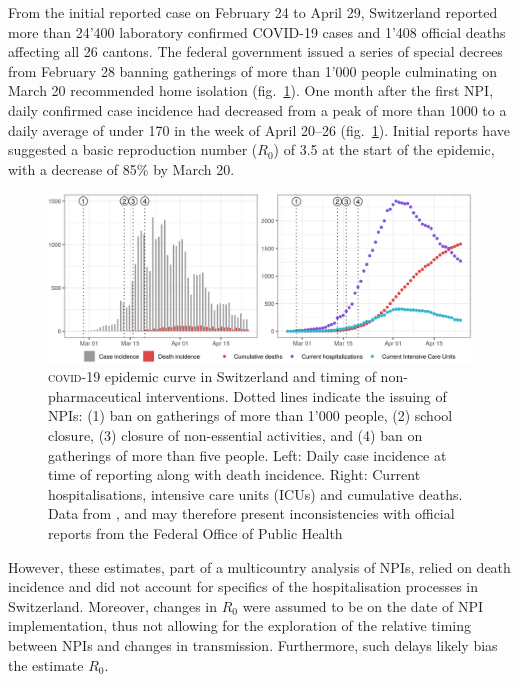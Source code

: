 From the initial reported case on February 24 to April 29, Switzerland reported more than 24'400 laboratory confirmed COVID-19 cases and 1'408 official deaths affecting all 26 cantons\cite{OFSP:RapportSituationEpidemiologique:2020}. The federal government issued a series of special decrees from February 28 banning gatherings of more than 1'000 people culminating on March 20 recommended home isolation (fig.~\ref{fig:covid-ch-data}). One month after the first NPI, daily confirmed case incidence had decreased from a peak of more than 1000 to a daily average of under 170 in the week of April 20–26 (fig.~\ref{fig:covid-ch-data}). Initial reports have suggested a basic reproduction number ($R_0$) of 3.5 at the start of the epidemic, with a decrease of 85\% by March 20\cite[-3\baselineskip]{Flaxman:Report13Estimating:2020}.
\begin{figure}\centering
  \includegraphics[width=\textwidth]{fig_covid-switzerland-npi/FIGURE_1.png}
  \caption[\textsc{covid}-19 epidemic curve in Switzerland and timing of interventions]{\textsc{covid}-19 epidemic curve in Switzerland and timing of non-pharmaceutical interventions. Dotted lines indicate the issuing of NPIs: (1) ban on gatherings of more than 1'000 people, (2) school closure, (3) closure of non-essential activities, and (4) ban on gatherings of more than five people. Left: Daily case incidence at time of reporting along with death incidence. Right: Current hospitalisations, intensive care units (ICUs) and cumulative deaths. Data from \textcite{Probst:DaenuprobstCovid19casesswitzerland:2020}, and may therefore present inconsistencies with official reports from the Federal Office of Public Health%
  }
  \label{fig:covid-ch-data}
\end{figure}
 However, these estimates, part of a multicountry analysis of NPIs, relied on death incidence and did not account for specifics of the hospitalisation processes in Switzerland. Moreover, changes in $R_0$ were assumed to be on the date of NPI implementation, thus not allowing for the exploration of the relative timing between NPIs and changes in transmission. Furthermore, such delays likely bias the estimate $R_0$. 

